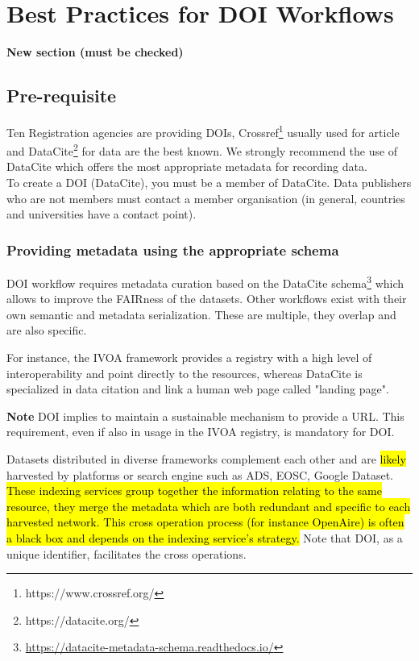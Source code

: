 \documentclass[11pt,a4paper]{ivoa}
\newcommand{\important}[1]{
	\begin{bigdescription}
		\item \color{ivoacolor}\textbf{Note} #1
	\end{bigdescription}
}
\begin{document}
\section{Best Practices for DOI Workﬂows}
\textbf{\color{red}New section (must be checked)}

\subsection{Pre-requisite}
Ten Registration agencies are providing DOIs, Crossref\footnote{https://www.crossref.org/} usually used for article and DataCite\footnote{https://datacite.org/} for data are the best known. 
We strongly recommend the use of DataCite which offers the most appropriate metadata for recording data.\\

To create a DOI (DataCite), you must be a member of DataCite. Data publishers who are not members must contact a member organisation (in general, countries and universities have a contact point).


\subsubsection{Providing metadata using the appropriate schema}
\label{sec:bestpractice:providing}
DOI workflow requires metadata curation based on the DataCite schema\footnote{\url{https://datacite-metadata-schema.readthedocs.io/}} which allows to improve the FAIRness of the datasets. Other workflows exist with their own semantic and metadata serialization. These are multiple, they overlap and are also specific.

For instance, the IVOA framework provides a registry with a high level  of interoperability and point directly to the resources, whereas DataCite is specialized in data citation and link a human web page called "landing page".

\important{
DOI implies to maintain a sustainable mechanism to provide a URL. 
This requirement, even if also in usage in the IVOA registry, is mandatory for DOI.
}

Datasets distributed in diverse frameworks complement each other and are \hl{likely} harvested by platforms or search engine such as ADS, EOSC, Google Dataset. 
\hl{These indexing services group together the information relating to the
	same resource, they merge the metadata which are both redundant and
	specific to each harvested network. This cross operation process
	(for instance OpenAire) is often a black box and depends on the
	indexing service's strategy.} %
Note that DOI, as a unique identifier, facilitates the cross operations.
\end{document}

